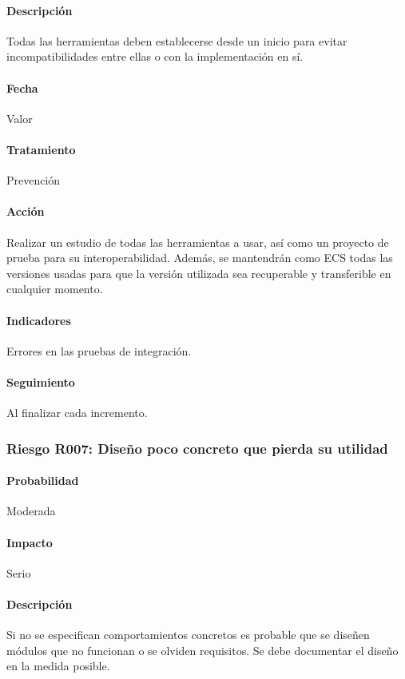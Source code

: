 \documentclass[10pt,a4paper]{article}
\begin{document}
				\paragraph{Descripción} Todas las herramientas deben establecerse desde un inicio para evitar incompatibilidades entre ellas o con la implementación en sí.
				\paragraph{Fecha} Valor %
				\paragraph{Tratamiento} Prevención %
				\paragraph{Acción} Realizar un estudio de todas las herramientas a usar, así como un proyecto de prueba para su interoperabilidad. Además, se mantendrán como ECS todas las versiones usadas para que la versión utilizada sea recuperable y transferible en cualquier momento. %
				\paragraph{Indicadores} Errores en las pruebas de integración. %
				\paragraph{Seguimiento}	Al finalizar cada incremento. %
				
			\subsubsection{Riesgo R007: Diseño poco concreto que pierda su utilidad}
				\paragraph{Probabilidad} Moderada
				\paragraph{Impacto}	Serio
				\paragraph{Descripción} Si no se especifican comportamientos concretos es probable que se diseñen módulos que no funcionan o se olviden requisitos. Se debe documentar el diseño en la medida posible.
\end{document}
